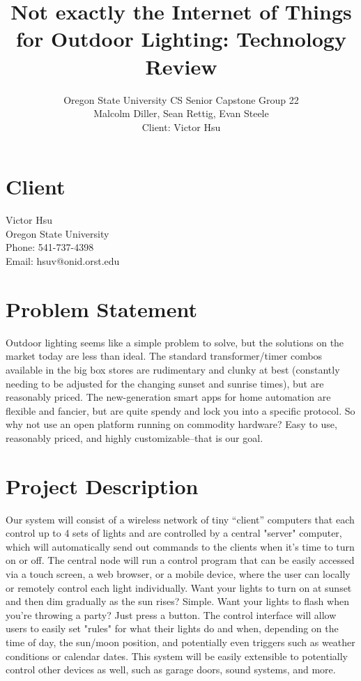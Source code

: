 \documentclass[12pt]{article}
\title{Not exactly the Internet of Things for Outdoor Lighting: Technology Review}
\author{Oregon State University CS Senior Capstone Group 22\\Malcolm Diller, Sean Rettig, Evan Steele\\Client: Victor Hsu}
\begin{document}
 

\maketitle

\pagebreak

\section{Client}

Victor Hsu\\
Oregon State University\\
Phone: 541-737-4398\\
Email: hsuv@onid.orst.edu

\section{Problem Statement}

Outdoor lighting seems like a simple problem to solve, but the solutions on the
market today are less than ideal.  The standard transformer/timer combos
available in the big box stores are rudimentary and clunky at best (constantly
needing to be adjusted for the changing sunset and sunrise times), but are
reasonably priced. The new-generation smart apps for home automation are
flexible and fancier, but are quite spendy and lock you into a specific
protocol.  So why not use an open platform running on commodity hardware?  Easy
to use, reasonably priced, and highly customizable--that is our goal. \\

\section{Project Description}

Our system will consist of a wireless network of tiny “client” computers that
each control up to 4 sets of lights and are controlled by a central "server"
computer, which will automatically send out commands to the clients when it's
time to turn on or off.  The central node will run a control program that can
be easily accessed via a touch screen, a web browser, or a mobile device, where
the user can locally or remotely control each light individually.  Want your
lights to turn on at sunset and then dim gradually as the sun rises?  Simple.
Want your lights to flash when you're throwing a party?  Just press a button.
The control interface will allow users to easily set "rules" for what their
lights do and when, depending on the time of day, the sun/moon position, and
potentially even triggers such as weather conditions or calendar dates.  This
system will be easily extensible to potentially control other devices as well,
such as garage doors, sound systems, and more. \\
\end{document}
